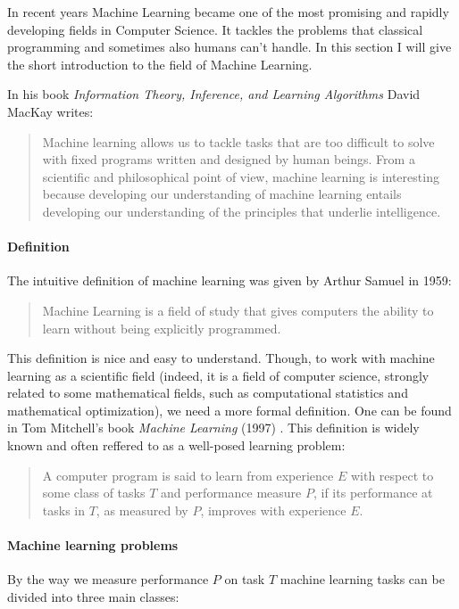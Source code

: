 In recent years Machine Learning became one of the most promising and rapidly developing fields in Computer Science. It tackles the problems that classical programming and sometimes also humans can't handle. In this section I will give the short introduction to the field of Machine Learning.

In his book \textit{Information Theory, Inference, and Learning Algorithms} \cite{MacKay-2003} David MacKay writes:
  \begin{quote}
    Machine learning allows us to tackle tasks that are too difficult to solve with fixed programs written and designed by human beings. From a scientific and philosophical point of view, machine learning is interesting because developing our understanding of machine learning entails developing our understanding of the principles that underlie intelligence.
  \end{quote}
  
  \paragraph{Definition}
  The intuitive definition of machine learning was given by Arthur Samuel in 1959:
  
  \begin{quote}
    Machine Learning is a field of study that gives computers the ability to learn without being explicitly programmed.
  \end{quote}
  
  This definition is nice and easy to understand. Though, to work with machine learning as a scientific field (indeed, it is a field of computer science, strongly related to some mathematical fields, such as computational statistics and mathematical optimization), we need a more formal definition. One can be found in Tom Mitchell's book \textit{Machine Learning} (1997) \cite{Mitchell-1997}. This definition is widely known and often reffered to as a well-posed learning problem:
  
  \begin{quote}
  A computer program is said to learn from experience $ E $ with respect to some class of tasks $ T $ and performance measure $ P $, if its performance at tasks in $ T $, as measured by $ P $, improves with experience $ E $.
  \end{quote}
  
  \paragraph{Machine learning problems}
  By the way we measure performance $ P $ on task $ T $ machine learning tasks can be divided into three main classes:
  
